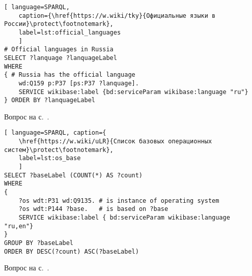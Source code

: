 \begin{task}
	\label{answer:official_language}
	
	\begin{lstlisting}[ language=SPARQL, 
	caption={\href{https://w.wiki/tky}{Официальные языки в России}\protect\footnotemark},
	label=lst:official_languages
	]
# Official languages in Russia
SELECT ?lanquage ?lanquageLabel
WHERE
{ # Russia has the official language
	wd:Q159 p:P37 [ps:P37 ?lanquage].
	SERVICE wikibase:label {bd:serviceParam wikibase:language "ru"}
} ORDER BY ?lanquageLabel
	\end{lstlisting}
	
	\small{Вопрос на с.~\pageref{lst:List_of_historical_countries}.}
\end{task}


\begin{task}
	\label{answer:os_base}

	\begin{lstlisting}[ language=SPARQL, caption={
	\href{https://w.wiki/uLR}{Список базовых операционных систем}\protect\footnotemark},
	label=lst:os_base
	]
SELECT ?baseLabel (COUNT(*) AS ?count)
WHERE
{
	?os wdt:P31 wd:Q9135. # is instance of operating system
	?os wdt:P144 ?base.   # is based on ?base
	SERVICE wikibase:label { bd:serviceParam wikibase:language "ru,en"}
}
GROUP BY ?baseLabel
ORDER BY DESC(?count) ASC(?baseLabel)
	\end{lstlisting}

	\small{Вопрос на с.~\pageref{lst:base_of_operating_systems}.}
\end{task}

